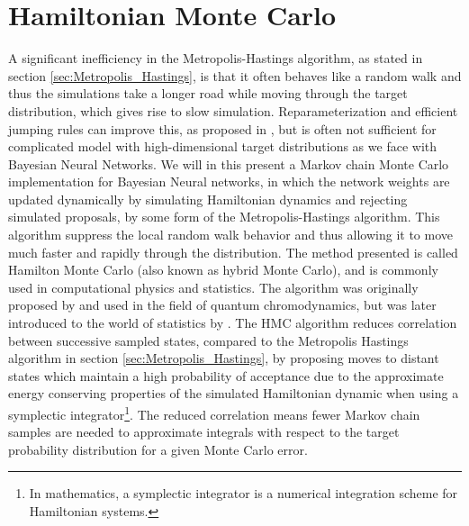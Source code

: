 \section{Hamiltonian Monte Carlo}
A significant inefficiency in the Metropolis-Hastings algorithm, as stated in section \ref{sec:Metropolis_Hastings}, is that it often behaves like a random walk and thus the simulations take a longer road while moving through the target distribution, which gives rise to slow simulation. Reparameterization and efficient jumping rules can improve this, as proposed in \cite{gelmanbda04}, but is often not sufficient for complicated model with high-dimensional target distributions as we face with Bayesian Neural Networks. We will in this present a Markov chain Monte Carlo implementation for Bayesian Neural networks, in which the network weights are updated dynamically by simulating Hamiltonian dynamics and rejecting simulated proposals, by some form of the Metropolis-Hastings algorithm. This algorithm suppress the local random walk behavior and thus allowing it to move much faster and rapidly through the distribution. The method presented is called Hamilton Monte Carlo (also known as hybrid Monte Carlo), and is commonly used in computational physics and statistics. The algorithm was originally proposed by \cite{Duane1987216} and used in the field of quantum chromodynamics, but was later introduced to the world of statistics by \cite{neal2012bayesian}. The HMC algorithm reduces correlation between successive sampled states, compared to the Metropolis Hastings algorithm in section \ref{sec:Metropolis_Hastings}, by proposing moves to distant states which maintain a high probability of acceptance due to the approximate energy conserving properties of the simulated Hamiltonian dynamic when using a symplectic integrator\footnote{In mathematics, a symplectic integrator is a numerical integration scheme for Hamiltonian systems.}. The reduced correlation means fewer Markov chain samples are needed to approximate integrals with respect to the target probability distribution for a given Monte Carlo error.

